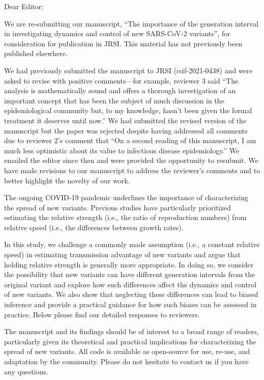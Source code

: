 \documentclass[12pt]{article}
\begin{document}
\noindent Dear Editor:

We are re-submitting our manuscript, “The importance of the generation interval in investigating dynamics and control of new SARS-CoV-2 variants”, for consideration for publication in JRSI. This material has not previously been published elsewhere.

We had previously submitted the manuscript to JRSI (rsif-2021-0438) and were asked to revise with positive comments---for example, reviewer 3 said “The analysis is mathematically sound and offers a thorough investigation of an important concept that has been the subject of much discussion in the epidemiological community but, to my knowledge, hasn't been given the formal treatment it deserves until now.” We had submitted the revised version of the manuscript but the paper was rejected despite having addressed all comments due to reviewer 2's comment that “On a second reading of this manuscript, I am much less optimistic about its value to infectious disease epidemiology.” We emailed the editor since then and were provided the opportunity to resubmit.  
We have made revisions to our manuscript to address the reviewer's comments and to better highlight the novelty of our work.

The ongoing COVID-19 pandemic underlines the importance of characterizing the spread of new variants. Previous studies have particularly prioritized estimating the relative strength (i.e., the ratio of reproduction numbers) from relative speed (i.e., the differences between growth rates). 

In this study, we challenge a commonly made assumption (i.e., a constant relative speed) in estimating transmission advantage of new variants and argue that holding relative strength is generally more appropriate.
In doing so, we consider the possibility that new variants can have different generation intervals from the original variant and explore how such differences affect the dynamics and control of new variants. 
We also show that neglecting these differences can lead to biased inference and provide a practical guidance for how such biases can be assessed in practice.
Below please find our detailed responses to reviewers.

The manuscript and its findings should be of interest to a broad range of readers, particularly given its theoretical and practical implications for characterizing the spread of new variants. All code is available as open-source for use, re-use, and adaptation by the community. Please do not hesitate to contact us if you have any questions.
\end{document}
